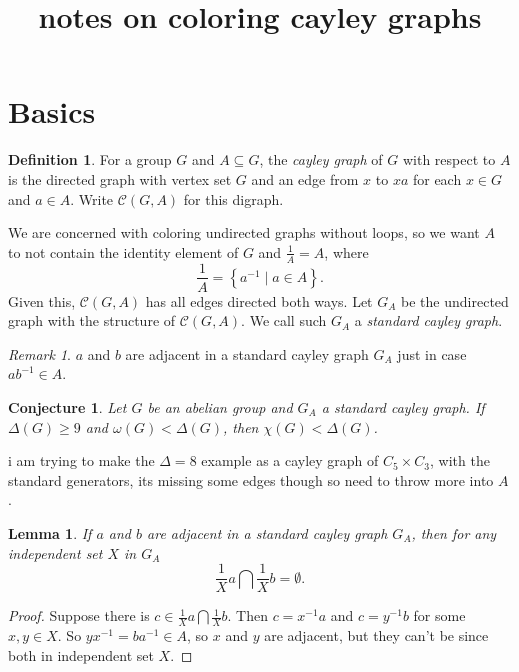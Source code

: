 \documentclass[12pt]{article}
\title{notes on coloring cayley graphs}
\theoremstyle{plain}
\newtheorem{lem}[thm]{Lemma}
\newtheorem{conjecture}[thm]{Conjecture}
\theoremstyle{definition}
\newtheorem{defn}{Definition}
\theoremstyle{remark}
\newtheorem*{remark}{Remark}
\newcommand{\fancy}[1]{\mathcal{#1}}
\newcommand{\C}[1]{\fancy{C}_{#1}}
\newcommand{\setbs}[2]{\left\{ #1 \mid #2 \right\}}
\def\C{\fancy{C}}
\begin{document}
\maketitle
\section{Basics}

\begin{defn}
For a group $G$ and $A \subseteq G$, the \emph{cayley graph} of $G$ with respect to $A$ is the directed graph with vertex set $G$ and an edge from $x$ to $xa$ for each $x \in G$ and $a \in A$.
Write $\C(G,A)$ for this digraph.
\end{defn}

We are concerned with coloring undirected graphs without loops, so we want $A$ to not contain the identity element of $G$ and $\frac{1}{A} = A$, where
\[\frac{1}{A} = \setbs{a^{-1}}{a \in A}.\]
Given this, $\C(G,A)$ has all edges directed both ways.  Let $G_A$ be the undirected graph with the structure of $\C(G,A)$.  We call such $G_A$ a \emph{standard cayley graph}.

\begin{remark}
$a$ and $b$ are adjacent in a standard cayley graph $G_A$ just in case $ab^{-1} \in A$.
\end{remark}


\begin{conjecture}
Let $G$ be an abelian group and $G_A$ a standard cayley graph.  If $\Delta(G) \ge 9$ and $\omega(G) < \Delta(G)$, then $\chi(G) < \Delta(G)$.
\end{conjecture}
i am trying to make the $\Delta=8$ example as a cayley graph of $C_5 \times C_3$, with the standard generators, its missing some edges though so need to throw more into $A$.

\begin{lem}
If $a$ and $b$ are adjacent in a standard cayley graph $G_A$, then for any independent set $X$ in $G_A$
\[\frac{1}{X}a \bigcap \frac{1}{X}b = \emptyset.\]
\end{lem}
\begin{proof}
Suppose there is $c \in \frac{1}{X}a \bigcap \frac{1}{X}b$.  Then $c = x^{-1}a$ and $c = y^{-1}b$ for some $x,y \in X$. So $yx^{-1} = ba^{-1} \in A$, so $x$ and $y$ are adjacent, but they can't be since both in independent set $X$.
\end{proof}
\end{document}
